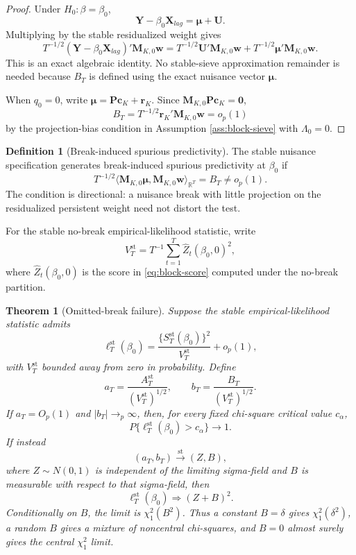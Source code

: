 \documentclass[12pt]{article}
\numberwithin{equation}{section}
\newtheorem{theorem}{Theorem}
\theoremstyle{definition}
\newtheorem{definition}{Definition}
\newcommand{\R}{\mathbb R}
\begin{document}
\begin{proof}
Under \(H_0:\beta=\beta_0\),
\[
    \bm Y-\beta_0\bm X_{lag}=\bm\mu+\bm U.
\]
Multiplying by the stable residualized weight gives
\[
    T^{-1/2}(\bm Y-\beta_0\bm X_{lag})'\bm M_{K,0}\bm w
    =
    T^{-1/2}\bm U'\bm M_{K,0}\bm w
    +
    T^{-1/2}\bm\mu'\bm M_{K,0}\bm w.
\]
This is an exact algebraic identity. No stable-sieve approximation remainder is needed because \(B_T\) is defined using the exact nuisance vector \(\bm\mu\).

When \(q_0=0\), write \(\bm\mu=\bm P\bm c_K+\bm r_K\). Since \(\bm M_{K,0}\bm P\bm c_K=\bm0\),
\[
    B_T
    =
    T^{-1/2}\bm r_K'\bm M_{K,0}\bm w
    =o_p(1)
\]
by the projection-bias condition in Assumption \ref{ass:block-sieve} with \(\Lambda_0=0\).
\end{proof}

\begin{definition}[Break-induced spurious predictivity]
The stable nuisance specification generates break-induced spurious predictivity at \(\beta_0\) if
\[
    T^{-1/2}
    \langle \bm M_{K,0}\bm\mu,\bm M_{K,0}\bm w\rangle_{\R^T}
    =
    B_T
    \not=o_p(1).
\]
The condition is directional: a nuisance break with little projection on the residualized persistent weight need not distort the test.
\end{definition}

For the stable no-break empirical-likelihood statistic, write
\[
    V_T^{\mathrm{st}}
    =
    T^{-1}\sum_{t=1}^T \widehat Z_t(\beta_0,0)^2,
\]
where \(\widehat Z_t(\beta_0,0)\) is the score in \eqref{eq:block-score} computed under the no-break partition.

\begin{theorem}[Omitted-break failure]
\label{thm:failure}
Suppose the stable empirical-likelihood statistic admits
\[
    \ell_T^{\mathrm{st}}(\beta_0)
    =
    \frac{\{S_T^{\mathrm{st}}(\beta_0)\}^2}{V_T^{\mathrm{st}}}
    +o_p(1),
\]
with \(V_T^{\mathrm{st}}\) bounded away from zero in probability. Define
\[
    a_T=\frac{A_T^{\mathrm{st}}}{(V_T^{\mathrm{st}})^{1/2}},
    \qquad
    b_T=\frac{B_T}{(V_T^{\mathrm{st}})^{1/2}}.
\]
If \(a_T=O_p(1)\) and \(|b_T|\to_p\infty\), then, for every fixed chi-square critical value \(c_\alpha\),
\[
    P\{\ell_T^{\mathrm{st}}(\beta_0)>c_\alpha\}\to1.
\]
If instead
\[
    (a_T,b_T)\xrightarrow{\mathrm{st}}(Z,B),
\]
where \(Z\sim N(0,1)\) is independent of the limiting sigma-field and \(B\) is measurable with respect to that sigma-field, then
\[
    \ell_T^{\mathrm{st}}(\beta_0)\Rightarrow (Z+B)^2.
\]
Conditionally on \(B\), the limit is \(\chi_1^2(B^2)\). Thus a constant \(B=\delta\) gives \(\chi_1^2(\delta^2)\), a random \(B\) gives a mixture of noncentral chi-squares, and \(B=0\) almost surely gives the central \(\chi_1^2\) limit.
\end{theorem}
\end{document}
